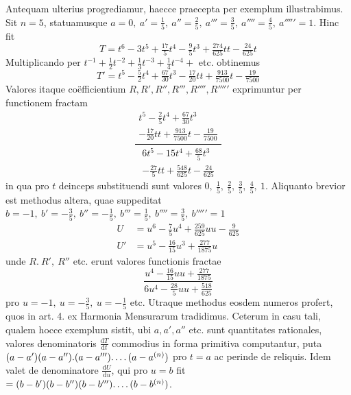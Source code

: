 Antequam ulterius progrediamur, haecce praecepta per exemplum illustrabimus. Sit $n=5$, statuamusque $a=0,\ a'=\frac15,\ a''=\frac25,\ a'''=\frac35,\ a''''=\frac45,\ a'''''=1$. Hinc fit
\[
T=t^6-3t^5+\tfrac{17}{5}t^4-\tfrac95t^3+\tfrac{274}{625}tt-\tfrac{24}{625}t
\]
Multiplicando per $t^{-1}+\frac12t^{-2}+\frac13t^{-3}+\frac14t^{-4}+$ etc. obtinemus
\[
T'=t^5-\tfrac52t^4+\tfrac{67}{30}t^3-\tfrac{17}{20}tt+\tfrac{913}{7500}t-\tfrac{19}{7500}
\]
Valores itaque co\"efficientium $R, R', R'', R''', R'''', R'''''$ exprimuntur per functionem fractam
\[
\frac{\begin{gathered}t^5-\frac25t^4+\frac{67}{30}t^3\\-\frac{17}{20}tt+\frac{913}{7500}t-\frac{19}{7500}\end{gathered}}
{\begin{gathered}6t^5-15t^4+\frac{68}{5}t^3\\-\frac{27}{5}tt+\frac{548}{625}t-\frac{24}{625}\end{gathered}}
\]
in qua pro $t$ deinceps substituendi sunt valores $0,\ \frac15,\ \frac25,\ \frac35,\ \frac45,\ 1$. Aliquanto brevior est methodus altera, quae suppeditat $b=-1,\ b'=-\frac35,\ b''=-\frac15,\ b'''=\frac15,\ b''''=\frac35,\ b'''''=1$
\[
\begin{aligned}
U&=u^6-\tfrac75u^4+\tfrac{259}{625}uu-\tfrac9{625}\\
U'&=u^5-\tfrac{16}{15}u^3+\tfrac{277}{1875}u
\end{aligned}
\]
unde $R.\ R',\ R''$ etc. erunt valores functionis fractae
\[
\frac{u^4-\frac{16}{15}uu+\frac{277}{1875}}
{6u^4-\frac{28}{5}uu+\frac{518}{625}}
\]
pro $u=-1,\ u=-\frac35,\ u=-\frac15$ etc. Utraque methodus eosdem numeros profert, quos in art. 4. ex Harmonia Mensurarum tradidimus. Ceterum in casu tali, qualem hocce exemplum sistit, ubi $a, a', a''$ etc. sunt quantitates rationales, valores denominatoris $\frac{\mathrm{d}T}{\mathrm{d}t}$ commodius in forma primitiva computantur, puta $(a-a')(a-a'').(a-a''')\ldotp\ldotp\ldotp\ldotp(a-a^{(n)})$ pro $t=a$ ac perinde de reliquis. Idem valet de denominatore $\frac{\mathrm{d}U}{\mathrm{d}u}$, qui pro $u=b$ fit $=(b-b')(b-b'')(b-b''')\ldotp\ldotp\ldotp\ldotp(b-b^{(n)})$.
